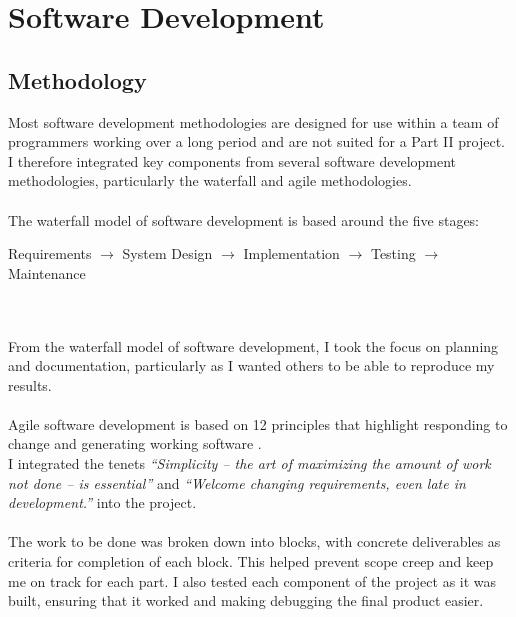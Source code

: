 \documentclass[12pt,a4paper]{report}
\begin{document}
\section{Software Development}
\subsection{Methodology}
Most software development methodologies are designed for use within a team of programmers working over a long period and are not suited for a 
Part II project. I therefore integrated key components from several software development methodologies, particularly the waterfall and agile methodologies. \\ \\
The waterfall model of software development is based around the five stages: \\
\centerline{Requirements $\rightarrow$ System Design $\rightarrow$ Implementation $\rightarrow$ Testing $\rightarrow$ Maintenance} \\ \\
From the waterfall model of software development, I took the focus on planning and documentation, particularly as I wanted others to be able to reproduce my results. \\ \\ 
Agile software development is based on 12 principles that highlight responding to change and generating working software \cite{agile}. \\
I integrated the tenets \emph{``Simplicity -- the art of maximizing the amount of work not done -- is essential''} \cite{agilep} and \emph{``Welcome changing requirements, even late in development.''} \cite{agilep} into the project.  \\ \\ 
The work to be done was broken down into blocks, with concrete deliverables as criteria for completion of each block. This helped prevent scope creep and keep me on track for each part. I also tested each component of the project as it was built, ensuring that it worked and making debugging the final product easier. \\
\end{document}
